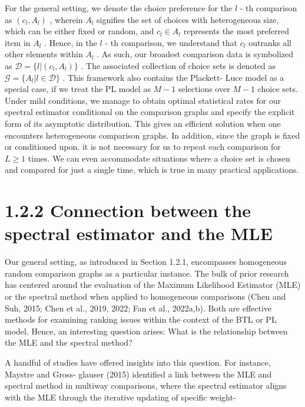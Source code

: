For the general setting, we denote the choice preference for the \(l\) -
th comparison as \((c_{l},A_{l})\) , wherein \(A_{l}\) signifies the set
of choices with heterogeneous size, which can be either fixed or random,
and \(c_{l}\in A_{l}\) represents the most preferred item in \(A_{l}\) .
Hence, in the \(l\) - th comparison, we understand that \(c_{l}\)
outranks all other elements within \(A_{l}\) . As such, our broadest
comparison data is symbolized as \(\mathcal{D} = \{l|(c_{l},A_{l})\}\) .
The associated collection of choice sets is denoted as
\(\mathcal{G} = \{A_{l}|l\in \mathcal{D}\}\) . This framework also
contains the Plackett- Luce model as a special case, if we treat the PL
model as \(M - 1\) selections over \(M - 1\) choice sets. Under mild
conditions, we manage to obtain optimal statistical rates for our
spectral estimator conditional on the comparison graphs and specify the
explicit form of its asymptotic distribution. This gives an efficient
solution when one encounters heterogeneous comparison graphs. In
addition, since the graph is fixed or conditioned upon, it is not
necessary for us to repeat each comparison for \(L\geq 1\) times. We can
even accommodate situations where a choice set is chosen and compared
for just a single time, which is true in many practical applications.

\section{1.2.2 Connection between the spectral estimator and the
MLE}\label{connection-between-the-spectral-estimator-and-the-mle}

Our general setting, as introduced in Section 1.2.1, encompasses
homogeneous random comparison graphs as a particular instance. The bulk
of prior research has centered around the evaluation of the Maximum
Likelihood Estimator (MLE) or the spectral method when applied to
homogeneous comparisons (Chen and Suh, 2015; Chen et al., 2019, 2022;
Fan et al., 2022a,b). Both are effective methods for examining ranking
issues within the context of the BTL or PL model. Hence, an interesting
question arises: What is the relationship between the MLE and the
spectral method?

A handful of studies have offered insights into this question. For
instance, Maystre and Gross- glauser (2015) identified a link between
the MLE and spectral method in multiway comparisons, where the spectral
estimator aligns with the MLE through the iterative updating of specific
weight-


